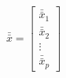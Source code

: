 

\[
\bar{\bar{x}} =
\left[
\begin{array}{c}
\bar{\bar{x}}_1 \\ \bar{\bar{x}}_2 \\ \vdots \\ \bar{\bar{x}}_p
\end{array}
\right]
\]


